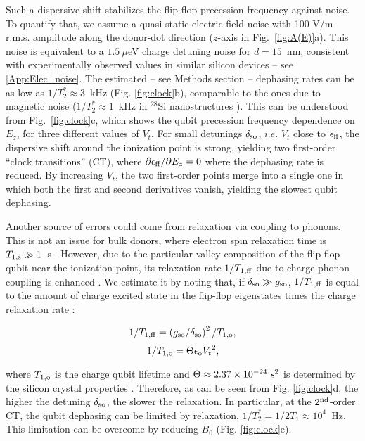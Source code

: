 \documentclass[aps,prb,superscriptaddress,nobibnotes,twocolumn]{revtex4-1}
\begin{document}
Such a dispersive shift stabilizes the flip-flop precession frequency against noise. To quantify that, we assume a quasi-static electric field noise with 100 V/m r.m.s. amplitude along the donor-dot direction ($z$-axis in Fig.~\ref{fig:A(E)}a). This noise is equivalent to a $1.5~\mu$eV charge detuning noise for $d=15$~nm, consistent with experimentally observed values in similar silicon devices \cite{Freeman2016,Thorgrimsson2016,Harvey-Collard2015} -- see \ref{App:Elec_noise}. The estimated -- see Methods section -- dephasing rates can be as low as $1/T_2^{\ast} \approx 3$~kHz (Fig. \ref{fig:clock}b), comparable to the ones due to magnetic noise ($1/T_2^{\ast} \approx 1$~kHz in $^{28}$Si nanostructures \cite{Muhonen2014}). This can be understood from Fig.~\ref{fig:clock}c, which shows the qubit precession frequency dependence on $E_z$, for three different values of $V_t$. For small detunings $\delta_{\rm so}$, $i.e.$ $V_t$ close to $\epsilon_{\rm ff}$, the dispersive shift around the ionization point is strong, yielding two first-order ``clock transitions'' (CT), where $\partial\epsilon_{\rm ff}/\partial E_z=0$ where the dephasing rate is reduced. By increasing $V_t$, the two first-order points merge into a single one in which both the first and second derivatives vanish, yielding the slowest qubit dephasing.

Another source of errors could come from relaxation via coupling to phonons. This is not an issue for bulk donors, where electron spin relaxation time is $T_{1,\rm s}\gg 1$~s \cite{Morello2010}. However, due to the particular valley composition of the flip-flop qubit near the ionization point, its relaxation rate ${1}/{T_{1,\rm ff}}$ due to charge-phonon coupling is enhanced \cite{Boross2016}. We estimate it by noting that, if $\delta_{\rm so}\gg g_{\rm so}$, ${1}/{T_{1,\rm ff}}$ is equal to the amount of charge excited state in the flip-flop eigenstates \cite{Blais2004} times the charge relaxation rate \cite{Boross2016}:

\begin{equation}\label{eq:T1ff}
{1}/{T_{1,\rm ff}}=\left({g_{\rm so}}/{\delta_{\rm so}}\right)^2/{T_{1,\rm o}},
\end{equation}
\begin{equation}\label{eq:T1o}
{1}/{T_{1,\rm o}}=\Theta\epsilon_{\rm o}{V_t}^2,
\end{equation}

where $T_{1,\rm o}$ is the charge qubit lifetime and $\Theta\approx2.37\times10^{-24}~{\rm s}^2$ is determined by the silicon crystal properties \cite{Boross2016}. Therefore, as can be seen from Fig. \ref{fig:clock}d, the higher the detuning $\delta_{\rm so}$, the slower the relaxation. In particular, at the $2^{\rm nd}$-order CT, the qubit dephasing can be limited by relaxation, $1/T_2^*=1/2T_1\approx10^4$~Hz. This limitation can be overcome by reducing $B_0$ (Fig. \ref{fig:clock}e).
\end{document}
